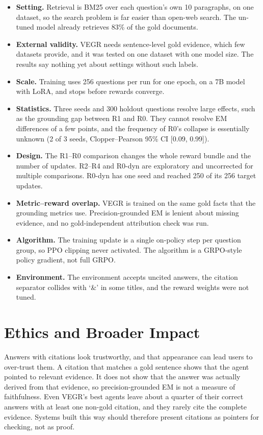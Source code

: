 \begin{itemize}
\tightlist
\item
  \textbf{Setting.} Retrieval is BM25 over each question's own 10
  paragraphs, on one dataset, so the search problem is far easier than
  open-web search. The un-tuned model already retrieves 83\% of the gold
  documents.
\item
  \textbf{External validity.} VEGR needs sentence-level gold evidence,
  which few datasets provide, and it was tested on one dataset with one
  model size. The results say nothing yet about settings without such
  labels.
\item
  \textbf{Scale.} Training uses 256 questions per run for one epoch, on
  a 7B model with LoRA, and stops before rewards converge.
\item
  \textbf{Statistics.} Three seeds and 300 holdout questions resolve
  large effects, such as the grounding gap between R1 and R0. They
  cannot resolve EM differences of a few points, and the frequency of
  R0's collapse is essentially unknown (2 of 3 seeds, Clopper--Pearson
  95\% CI {[}0.09, 0.99{]}).
\item
  \textbf{Design.} The R1--R0 comparison changes the whole reward bundle
  and the number of updates. R2--R4 and R0-dyn are exploratory and
  uncorrected for multiple comparisons. R0-dyn has one seed and reached
  250 of its 256 target updates.
\item
  \textbf{Metric--reward overlap.} VEGR is trained on the same gold
  facts that the grounding metrics use. Precision-grounded EM is lenient
  about missing evidence, and no gold-independent attribution check was
  run.
\item
  \textbf{Algorithm.} The training update is a single on-policy step per
  question group, so PPO clipping never activated. The algorithm is a
  GRPO-style policy gradient, not full GRPO.
\item
  \textbf{Environment.} The environment accepts uncited answers, the
  citation separator collides with `\&' in some titles, and the reward
  weights were not tuned.
\end{itemize}

\section{Ethics and Broader Impact}\label{sec:5.4}

Answers with citations look trustworthy, and that appearance can lead
users to over-trust them. A citation that matches a gold sentence shows
that the agent pointed to relevant evidence. It does not show that the
answer was actually derived from that evidence, so precision-grounded EM
is not a measure of faithfulness. Even VEGR's best agents leave about a
quarter of their correct answers with at least one non-gold citation,
and they rarely cite the complete evidence. Systems built this way
should therefore present citations as pointers for checking, not as
proof.

